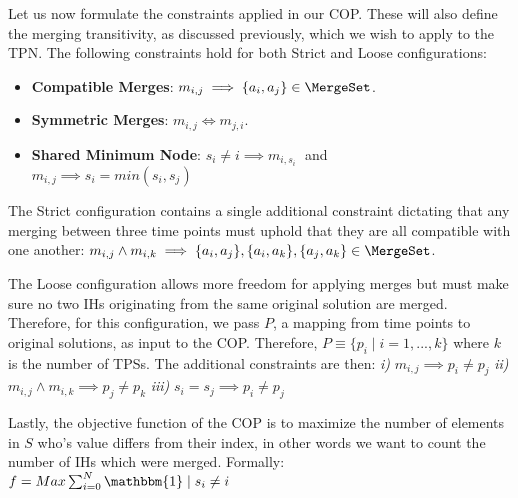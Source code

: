 Let us now formulate the constraints applied in our COP.
These will also define the merging transitivity, as discussed previously, which we wish to apply to the TPN. 
The following constraints hold for both Strict and Loose configurations:
\begin{itemize}
    \item\textbf{Compatible Merges}:  $m_{i, j} \implies \{a_i, a_j\} \in \MergeSet$.
    \item \textbf{Symmetric Merges}:  $m_{i, j} \iff m_{j, i}$.
    \item \textbf{Shared Minimum Node}:  $s_i \neq i \implies m_{i, s_i} \;$ and\\
    $m_{i, j} \implies s_i = min(s_i, s_j)$
\end{itemize}

The Strict configuration contains a single additional constraint dictating that any merging between three time points must uphold that they are all compatible with one another:
 $m_{i, j} \wedge m_{i, k} \implies \{a_i, a_j\},\{a_i, a_k\},\{a_j, a_k\} \in \MergeSet$.
    
The Loose configuration allows more freedom for applying merges but must make sure no two IHs originating from the same original solution are merged. Therefore, for this configuration, we pass $P$, a mapping from time points to original solutions, as input to the COP. Therefore, $P \equiv \{p_i \mid  i = 1,...,k \}$ where $k$ is the number of TPSs. The additional constraints are then:  
\textit{i)} $m_{i, j} \implies p_i \neq p_j$ \textit{ii)} $m_{i, j} \wedge m_{i, k} \implies p_j \neq p_k $ \textit{iii)} $ s_i = s_j \implies p_i \neq p_j$

Lastly, the objective function of the COP is to maximize the number of elements in $S$ who's value differs from their index, in other words we want to count the number of IHs which were merged. Formally: 
$f = Max \sum_{i=0}^{N} \mathbbm{1} \;|\;s_i \neq i$